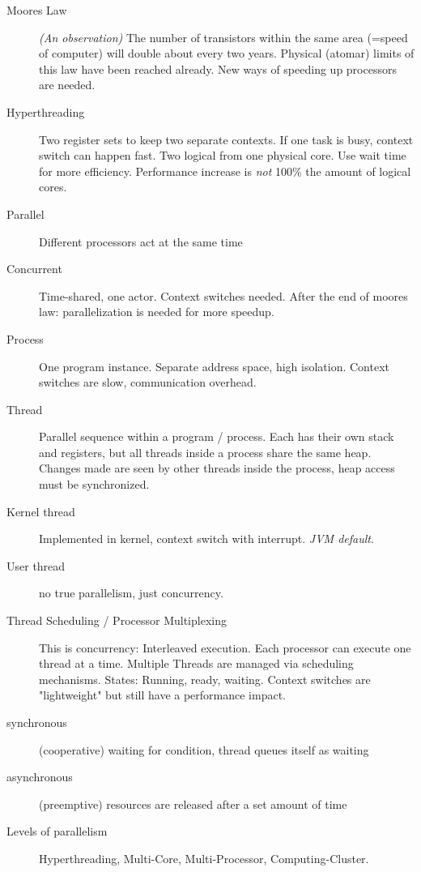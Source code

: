 \begin{description}
  \item[Moores Law] \textit{(An observation)} The number of transistors within the same area (=speed of computer) will double about every two years.   Physical (atomar) limits of this law have been reached already. New ways of speeding up processors are needed.
  
  \item[Hyperthreading] Two register sets to keep two separate contexts. If one task is busy, context switch can happen fast. Two logical from one physical core. Use wait time for more efficiency. 
  Performance increase is \emph{not} 100\% the amount of logical cores.
  
  \item[Parallel] Different processors act at the same time
  
  \item[Concurrent] Time-shared, one actor. Context switches needed.
  After the end of moores law: parallelization is needed for more speedup.
  
  \item[Process] One program instance. Separate address space, high isolation. Context switches are slow, communication overhead.
  
  \item[Thread] Parallel sequence within a program / process. Each has their own stack and registers, but all threads inside a process share the same heap. Changes made are seen by other threads inside the process, heap access must be synchronized.
  
  \item[Kernel thread] Implemented in kernel, context switch with interrupt. \textit{JVM default}.
  \item[User thread] no true parallelism, just concurrency.

  \item[Thread Scheduling / Processor Multiplexing] This is concurrency: Interleaved execution. 
  Each processor can execute one thread at a time. Multiple Threads are managed via scheduling mechanisms.
  States: Running, ready, waiting.
  Context switches are "lightweight" but still have a performance impact.

  \item[synchronous] (cooperative) waiting for condition, thread queues itself as waiting
  \item[asynchronous] (preemptive) resources are released after a set amount of time
  \item[Levels of parallelism] Hyperthreading, Multi-Core, Multi-Processor, Computing-Cluster.
\end{description}
\vspace{-1mm}

